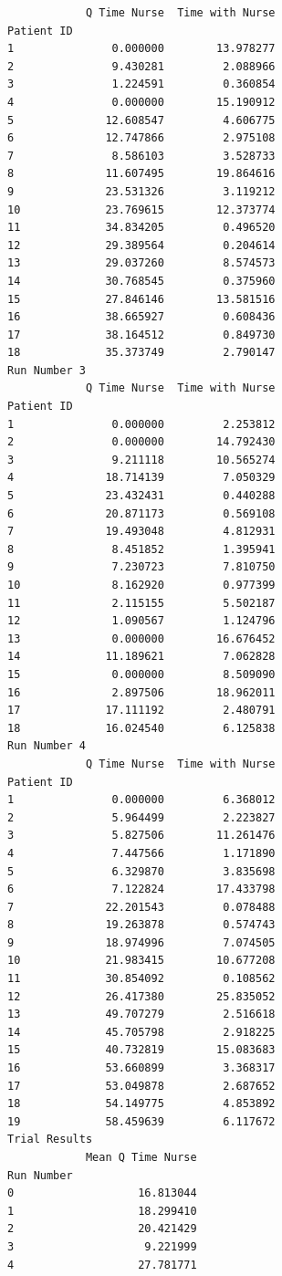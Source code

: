 \documentclass[
  letterpaper,
  DIV=11,
  numbers=noendperiod]{scrreprt}
\begin{document}
\begin{verbatim}
            Q Time Nurse  Time with Nurse
Patient ID                               
1               0.000000        13.978277
2               9.430281         2.088966
3               1.224591         0.360854
4               0.000000        15.190912
5              12.608547         4.606775
6              12.747866         2.975108
7               8.586103         3.528733
8              11.607495        19.864616
9              23.531326         3.119212
10             23.769615        12.373774
11             34.834205         0.496520
12             29.389564         0.204614
13             29.037260         8.574573
14             30.768545         0.375960
15             27.846146        13.581516
16             38.665927         0.608436
17             38.164512         0.849730
18             35.373749         2.790147
Run Number 3
            Q Time Nurse  Time with Nurse
Patient ID                               
1               0.000000         2.253812
2               0.000000        14.792430
3               9.211118        10.565274
4              18.714139         7.050329
5              23.432431         0.440288
6              20.871173         0.569108
7              19.493048         4.812931
8               8.451852         1.395941
9               7.230723         7.810750
10              8.162920         0.977399
11              2.115155         5.502187
12              1.090567         1.124796
13              0.000000        16.676452
14             11.189621         7.062828
15              0.000000         8.509090
16              2.897506        18.962011
17             17.111192         2.480791
18             16.024540         6.125838
Run Number 4
            Q Time Nurse  Time with Nurse
Patient ID                               
1               0.000000         6.368012
2               5.964499         2.223827
3               5.827506        11.261476
4               7.447566         1.171890
5               6.329870         3.835698
6               7.122824        17.433798
7              22.201543         0.078488
8              19.263878         0.574743
9              18.974996         7.074505
10             21.983415        10.677208
11             30.854092         0.108562
12             26.417380        25.835052
13             49.707279         2.516618
14             45.705798         2.918225
15             40.732819        15.083683
16             53.660899         3.368317
17             53.049878         2.687652
18             54.149775         4.853892
19             58.459639         6.117672
Trial Results
            Mean Q Time Nurse
Run Number                   
0                   16.813044
1                   18.299410
2                   20.421429
3                    9.221999
4                   27.781771
\end{verbatim}
\end{document}

